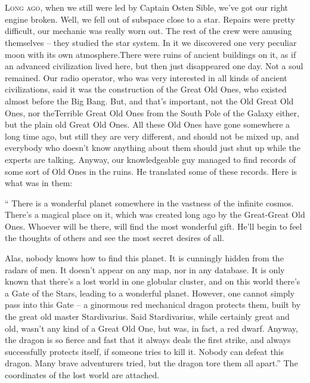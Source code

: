 \documentclass[ebook,oneside,final,openright]{memoir}
\begin{document}
\chapter{}
\par
\lettrine{L}{ong ago,} when we still were led by Captain Osten Sible, we’ve got our right engine broken. Well, we fell out of subspace close to a star. Repairs were pretty difficult, our mechanic was really worn out. The rest of the crew were amusing themselves – they studied the star system. In it we discovered one very peculiar moon with its own atmosphere.There were ruins of ancient buildings on it, as if an advanced civilization lived here, but then just disappeared one day. Not a soul remained. Our radio operator, who was very interested in all kinds of ancient civilizations, said it was the construction of the Great Old Ones, who existed almost before the Big Bang. But, and that’s important, not the Old Great Old Ones, nor theTerrible Great Old Ones from the South Pole of the Galaxy either, but the plain old Great Old Ones. All these Old Ones have gone somewhere a long time ago, but still they are very different, and should not be mixed up, and everybody who doesn’t know anything about them should just shut up while the experts are talking. Anyway, our knowledgeable guy managed to find records of some sort of Old Ones in the ruins. He translated some of these records. Here is what was in them:\par
\par
“ There is a wonderful planet somewhere in the vastness of the infinite cosmos. There’s a magical place on it, which was created long ago by the Great-Great Old Ones. Whoever will be there, will find the most wonderful gift. He’ll begin to feel the thoughts of others and see the most secret desires of all. \par
Alas, nobody knows how to find this planet. It is cunningly hidden from the radars of men. It doesn’t appear on any map, nor in any database. It is only known that there’s a lost world in one globular cluster, and on this world there’s a Gate of the Stars, leading to a wonderful planet. However, one cannot simply pass into this Gate – a ginormous red mechanical dragon protects them, built by the great old master Stardivarius. Said Stardivarius, while certainly great and old, wasn’t any kind of a Great Old One, but was, in fact, a red dwarf. Anyway, the dragon is so fierce and fast that it always deals the first strike, and always successfully protects itself, if someone tries to kill it. Nobody can defeat this dragon. Many brave adventurers tried, but the dragon tore them all apart.” The coordinates of the lost world are attached.\par
\end{document}
